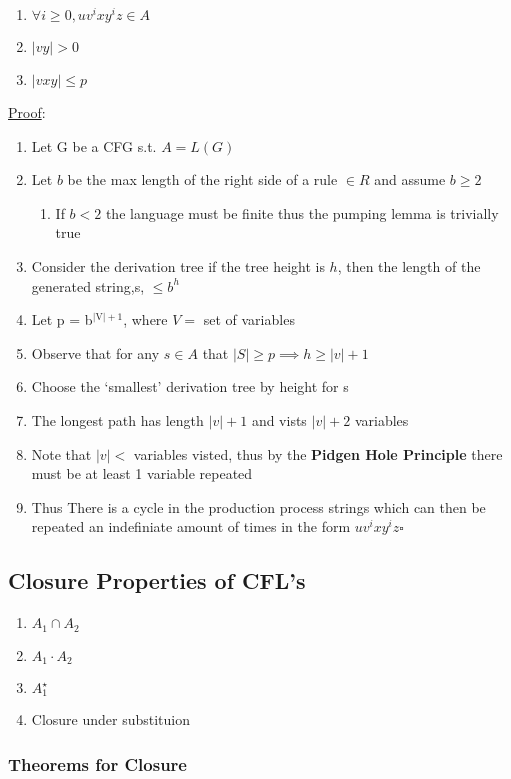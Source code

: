 \documentclass[11pt]{article}
\begin{document}
\begin{enumerate}
\item $\forall i \geq 0, uv^ixy^iz \in A$
\item $|vy| > 0$
\item $|vxy| \leq p$
\end{enumerate}
   \underline{Proof}:
\begin{enumerate}
\item Let G be a CFG s.t. $A=L(G)$
\item Let $b$ be the max length of the right side of a rule $\in R$
      and assume $b \geq 2$

\begin{enumerate}
\item If $b < 2$ the language must be finite thus the pumping lemma
         is trivially true
\end{enumerate}

\item Consider the derivation tree if the tree height is $h$, then the
      length of the generated string,s, $\leq b^h$
\item Let p = b$^{\mathrm{|V|+1}}$, where $V =$ set of variables
\item Observe that for any $s\in A$ that $|S| \geq p \implies h
      \geq |v|+1$
\item Choose the `smallest' derivation tree by height for s
\item The longest path has length $|v|+1$ and vists $|v|+2$ variables
\item Note that $|v|<$ variables visted, thus by the \textbf{Pidgen Hole       Principle} there must be at least 1 variable repeated
\item Thus There is a cycle in the production process strings which
      can then be repeated an indefiniate amount of times in the form
      $uv^ixy^iz \square$
\end{enumerate}
\subsection{Closure Properties of CFL's}
\label{sec-3.7}

\begin{enumerate}
\item $A_1 \cap A_2$
\item $A_1 \cdot A_2$
\item $A_1^{\star}$
\item Closure under substituion
\end{enumerate}
\subsubsection{Theorems for Closure}
\label{sec-3.7.1}
\end{document}
